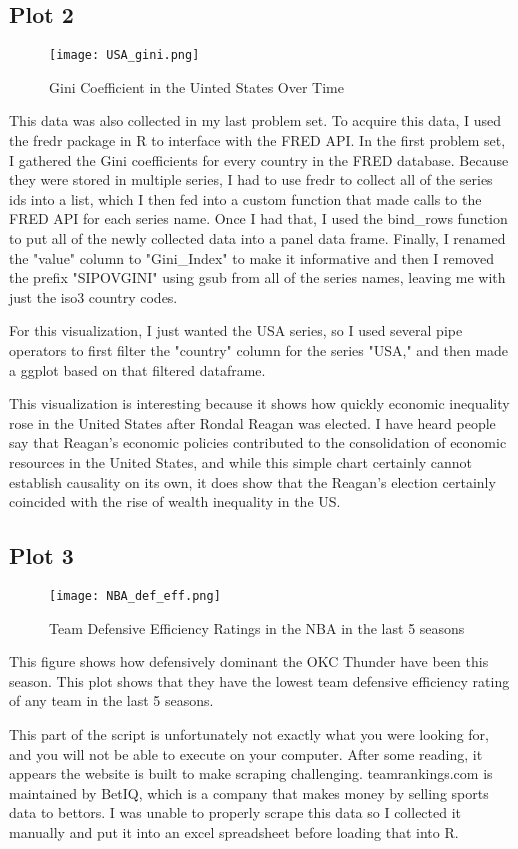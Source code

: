 \documentclass{article}
\begin{document}
\subsection{Plot 2}

\begin{figure}[h] 
    \centering
    \texttt{[image: USA\_gini.png]}
    \caption{Gini Coefficient in the Uinted States Over Time}
    \label{fig:hail density}
\end{figure}

This data was also collected in my last problem set. To acquire this data, I used the fredr package in R to interface with the FRED API. In the first problem set, I gathered the Gini coefficients for every country in the FRED database. Because they were stored in multiple series, I had to use fredr to collect all of the series ids into a list, which I then fed into a custom function that made calls to the FRED API for each series name. Once I had that, I used the bind\_rows function to put all of the newly collected data into a panel data frame. Finally, I renamed the "value" column to "Gini\_Index" to make it informative and then I removed the prefix "SIPOVGINI" using gsub from all of the series names, leaving me with just the iso3 country codes. 

For this visualization, I just wanted the USA series, so I used several pipe operators to first filter the "country" column for the series "USA," and then made a ggplot based on that filtered dataframe. 

This visualization is interesting because it shows how quickly economic inequality rose in the United States after Rondal Reagan was elected. I have heard people say that Reagan's economic policies contributed to the consolidation of economic resources in the United States, and while this simple chart certainly cannot establish causality on its own, it does show that the Reagan's election certainly coincided with the rise of wealth inequality in the US. 

\subsection{Plot 3}

\begin{figure}[h] 
    \centering
    \texttt{[image: NBA\_def\_eff.png]}
    \caption{Team Defensive Efficiency Ratings in the NBA in the last 5 seasons}
    \label{fig:hail density}
\end{figure}

This figure shows how defensively dominant the OKC Thunder have been this season. This plot shows that they have the lowest team defensive efficiency rating of any team in the last 5 seasons. 

This part of the script is unfortunately not exactly what you were looking for, and you will not be able to execute on your computer. After some reading, it appears the website is built to make scraping challenging. teamrankings.com is maintained by BetIQ, which is a company that makes money by selling sports data to bettors. I was unable to properly scrape this data so I collected it manually and put it into an excel spreadsheet before loading that into R.
\end{document}
